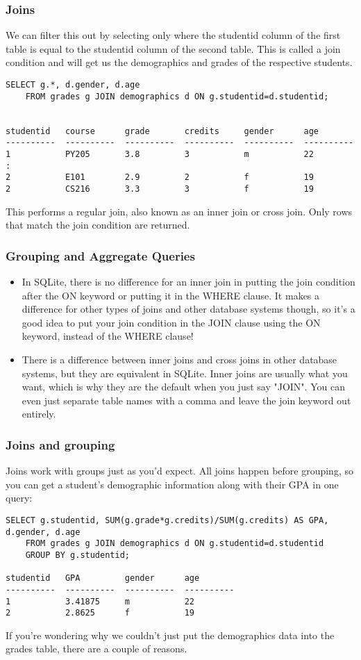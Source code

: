 \begin{frame}[fragile] \frametitle{Joins}
We can filter this out by selecting only where the studentid column of the first table is equal to the studentid column of the second table. This is called a join condition and will get us the demographics and grades of the respective students.
\begin{lstlisting}
SELECT g.*, d.gender, d.age
    FROM grades g JOIN demographics d ON g.studentid=d.studentid;


studentid   course      grade       credits     gender      age       
----------  ----------  ----------  ----------  ----------  ----------
1           PY205       3.8         3           m           22        
:    
2           E101        2.9         2           f           19        
2           CS216       3.3         3           f           19        
\end{lstlisting}
This performs a regular join, also known as an inner join or cross join. Only rows that match the join condition are returned.
\end{frame}

\begin{frame}[fragile] \frametitle{Grouping and Aggregate Queries}
\begin{itemize}
\item In SQLite, there is no difference for an inner join in putting the join condition after the ON keyword or putting it in the WHERE clause. It makes a difference for other types of joins and other database systems though, so it's a good idea to put your join condition in the JOIN clause using the ON keyword, instead of the WHERE clause!

\item There is a difference between inner joins and cross joins in other database systems, but they are equivalent in SQLite. Inner joins are usually what you want, which is why they are the default when you just say "JOIN". You can even just separate table names with a comma and leave the join keyword out entirely.
\end{itemize}
\end{frame}

\begin{frame}[fragile] \frametitle{Joins and grouping}
Joins work with groups just as you'd expect. All joins happen before grouping, so you can get a student's demographic information along with their GPA in one query:
\begin{lstlisting}
SELECT g.studentid, SUM(g.grade*g.credits)/SUM(g.credits) AS GPA, d.gender, d.age
    FROM grades g JOIN demographics d ON g.studentid=d.studentid
    GROUP BY g.studentid;

studentid   GPA         gender      age       
----------  ----------  ----------  ----------
1           3.41875     m           22        
2           2.8625      f           19     
\end{lstlisting}
If you're wondering why we couldn't just put the demographics data into the grades table, there are a couple of reasons. 
\end{frame}


